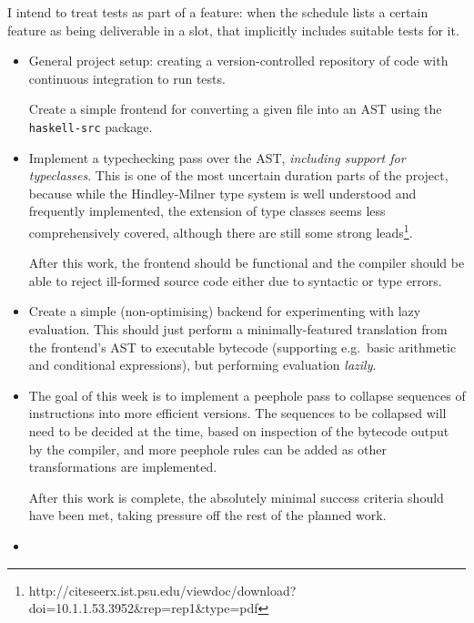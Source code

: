 \documentclass[12pt]{article}
\newcommand\monospace[1]{\texttt{#1}}
\begin{document}
I intend to treat tests as part of a feature: when the schedule lists a certain feature as being deliverable in a slot,
that implicitly includes suitable tests for it.




\begin{itemize}
\item
{

    General project setup: creating a version-controlled repository of code with continuous integration to run tests.

    Create a simple frontend for converting a given file into an AST using the \monospace{haskell-src} package.
}
\item
{

    Implement a typechecking pass over the AST, \textit{including support for typeclasses}. This is one of the most
    uncertain duration parts of the project, because while the Hindley-Milner type system is well understood and
    frequently implemented, the extension of type classes seems less comprehensively covered, although there are still
    some strong leads\footnote{http://citeseerx.ist.psu.edu/viewdoc/download?doi=10.1.1.53.3952\&rep=rep1\&type=pdf}.

    After this work, the frontend should be functional and the compiler should be able to reject ill-formed
    source code either due to syntactic or type errors.
}
\item
{

    Create a simple (non-optimising) backend for experimenting with lazy evaluation. This should just perform a
    minimally-featured translation from the frontend's AST to executable bytecode (supporting e.g.\ basic arithmetic and
    conditional expressions), but performing evaluation \textit{lazily}.
}
\item
{

    The goal of this week is to implement a peephole pass to collapse sequences of instructions into more efficient
    versions. The sequences to be collapsed will need to be decided at the time, based on inspection of the bytecode
    output by the compiler, and more peephole rules can be added as other transformations are implemented.
    
    After this work is complete, the absolutely minimal success criteria should have been met, taking pressure off the
    rest of the planned work.
}
\item
{

}
\end{itemize}
\end{document}
